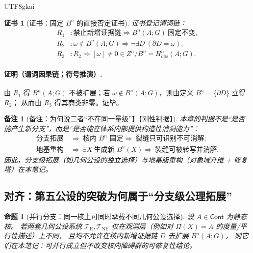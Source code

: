 \documentclass[12pt]{article}
\newtheorem{proposition}{命题}[section]
\newtheorem{remark}{备注}[section]
\newtheorem{Certificate}{证书}[section]
\newcommand{\KouJing}{\texorpdfstring{表述约定}{表述约定}}
\begin{document}
\begin{CJK*}{UTF8}{gkai}
\begin{Certificate}[证书：固定 $B^n$ 的直接否定证书]
\label{cert:tex29-ch15-crack-persist}
证书登记谓词链：
\[
\begin{aligned}
  R_1 &: \text{禁止新增证据链}\Rightarrow B^n(A;G)\ \text{固定不变},\\
  R_2 &: \omega\notin B^n(A;G)\Rightarrow \neg\exists D\ (\partial D=\omega),\\
  R_3 &: R_2\Rightarrow [\omega]\neq 0\in Z^n/B^n=H^n_{\mathrm{obs}}(A;G).
\end{aligned}
\]
\end{Certificate}

\paragraph{证明（谓词因果链；符号推演）.}
由 $R_1$ 得 $B^n(A;G)$ 不被扩展；若 $\omega\notin B^n(A;G)$，则由定义 $B^n=\{\partial D\}$ 立得 $R_2$；
从而由 $R_3$ 得其商类非零。证毕。

\begin{remark}[备注：为何说二者“不在同一量级”】【刚性判据】]
本章的判据不是“是否能产生新分支”，而是“是否能在体系内部提供构造性消洞能力”：
\[
\begin{aligned}
  \text{分支拓展}\ &\Rightarrow\ \text{核内 }B^n\text{ 固定}\Rightarrow\ \text{裂缝只可识别不可消解};\\
  \text{地基重构}\ &\Rightarrow\ \exists X\ \text{生成新 }B^n(X)\Rightarrow\ \text{裂缝可被转写并消解}.
\end{aligned}
\]
因此，分支级拓展（如几何公设的独立选择）与地基级重构（对象域升维 + 修复塔）在本笔记。
\end{remark}

\subsection{对齐：第五公设的突破为何属于“分支级公理拓展”}
\label{subsec:tex29-ch15-parallel}

\begin{proposition}[并行分支：同一核上可同时承载不同几何公设选择]
\label{prop:tex29-ch15-parallel-branch}
设 $A\in\mathsf{Cont}$ 为静态核。
若两套几何公设系统 $\mathcal{T}_{\mathrm{E}},\mathcal{T}_{\mathrm{NE}}$ 仅在观测层（例如对 $\Pi(X)=A$ 的度量/平行性描述）上不同，
且均不允许在核内新增证据链 $D$ 去扩展 $B^n(A;G)$，
则它们在本笔记：可并行成立但不改变核内障碍群的可修复性结论。
\end{proposition}


\end{CJK*}
\end{document}
